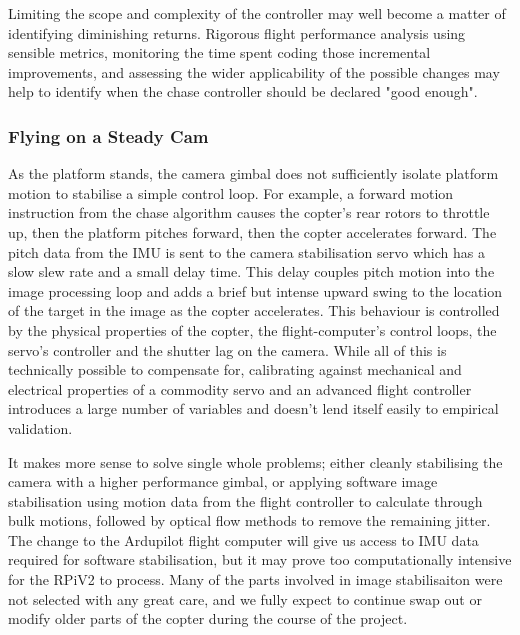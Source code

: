 \documentclass[a4paper, 11pt, titlepage]{article}
\begin{document}
      Limiting the scope and complexity of the controller may well become a matter of identifying diminishing returns.  Rigorous flight performance analysis using sensible metrics, monitoring the time spent coding those incremental improvements, and assessing the wider applicability of the possible changes may help to identify when the chase controller should be declared "good enough".


    \subsubsection{Flying on a Steady Cam}
    \label{sec:Camera Stability}
      As the platform stands, the camera gimbal does not sufficiently isolate platform motion to stabilise a simple control loop.
      For example, a forward motion instruction from the chase algorithm causes the copter's rear rotors to throttle up, then the platform pitches forward, then the copter accelerates forward.  The pitch data from the IMU is sent to the camera stabilisation servo which has a slow slew rate and a small delay time.  This delay couples pitch motion into the image processing loop and adds a brief but intense upward swing to the location of the target in the image as the copter accelerates.
      This behaviour is controlled by the physical properties of the copter, the flight-computer's control loops, the servo's controller and the shutter lag on the camera.
      While all of this is technically possible to compensate for, calibrating against mechanical and electrical properties of a commodity servo and an advanced flight controller introduces a large number of variables and doesn't lend itself easily to empirical validation.  

      It makes more sense to solve single whole problems; either cleanly stabilising the camera with a higher performance gimbal, or applying software image stabilisation using motion data from the flight controller to calculate through bulk motions, followed by optical flow methods to remove the remaining jitter.
      The change to the Ardupilot flight computer will give us access to IMU data required for software stabilisation, but it may prove too computationally intensive for the RPiV2 to process.  Many of the parts involved in image stabilisaiton were not selected with any great care, and we fully expect to continue swap out or modify older parts of the copter during the course of the project.
\end{document}
